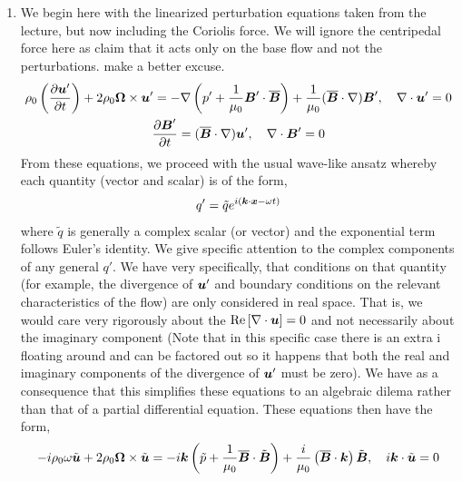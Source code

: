 \documentclass{article}
\begin{document}
\section{}
\begin{enumerate}[label=\alph*.)]
    \item We begin here with the linearized perturbation equations taken from
    the lecture, but now including the Coriolis force. We will ignore the
    centripedal force here as claim that it acts only on the base flow and not
    the perturbations. {\color{red} make a better excuse}. 
    \begin{gather*}
        \rho_0\left(\frac{\partial \boldsymbol{u}'}{\partial t} \right) + 2\rho_0\boldsymbol{\Omega}\times\boldsymbol{u}'= -\nabla \left(p' +
        \frac{1}{\mu_0}\boldsymbol{B}'\cdot\overline{\boldsymbol{B}}\right) + \frac{1}{\mu_0}(\overline{\boldsymbol{B}}\cdot\nabla)\boldsymbol{B}', \quad \nabla \cdot{\boldsymbol{u}'}
        = 0\\
        \frac{\partial \boldsymbol{B}'}{\partial t} = (\overline{\boldsymbol{B}}\cdot\nabla)\boldsymbol{u}', \quad \nabla \cdot{\boldsymbol{B}'} = 0
    \end{gather*}
    From these equations, we proceed with the usual wave-like ansatz whereby
    each quantity (vector and scalar) is of the form, 
    \begin{gather*}
        q' = \tilde{q}e^{i\left(\boldsymbol{k}\cdot\boldsymbol{x} - \omega t\right)}
    \end{gather*}
    where $\tilde{q}$ is generally a complex scalar (or vector) and the
    exponential term follows Euler's identity. We give specific attention to the
    complex components of any general $q'$. We have very specifically, that
    conditions on that quantity (for example, the divergence of $\boldsymbol{u}'$ and boundary
    conditions on the relevant characteristics of the flow) are only considered
    in real space. That is, we would care very rigorously about the
    $\text{Re}\left[\nabla \cdot{\boldsymbol{u}}\right] = 0$ and not necessarily about the imaginary component
    (Note that in this specific case there is an extra i floating around and can
    be factored out so it happens that both the real and imaginary components of
    the divergence of $\boldsymbol{u}'$ must be zero). We have as a consequence that
    this simplifies these equations to an algebraic dilema rather than that of a
    partial differential equation. These equations then have the form, 
    \begin{gather*}
        -i\rho_0\omega\tilde{\uvec} + 2\rho_0\bs{\Omega}\times\tilde{\uvec} =
        -i\k\left(\tilde{p} + \frac{1}{\mu_0}\overline{\B}\cdot\tilde{\B}\right)
        + \frac{i}{\mu_0}\left(\overline{\B}\cdot\k\right)\tilde{\B}, \quad
        i\k\cdot\tilde{\uvec} = 0\\

\end{gather*}
\end{enumerate}
\end{document}
